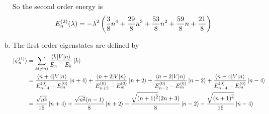 \documentclass[a4paper,german,12pt,smallheadings]{scrartcl}
\begin{document}
\begin{enumerate}[a)]
    So the second order energy is
    \begin{equation*}
      E_n^{(2)}(\lambda)  = -\lambda^2 \del{\frac{3}{8}n^4 + \frac{29}{8}n^3 + \frac{53}{8}n^2 + \frac{59}{8} n + \frac{21}{8}}
    \end{equation*}

  \item
    The first order eigenstates are defined by
    \begin{align*}
      \ket{\psi_n^{(1)}} &= \sum_{k (\neq n)} \frac{\braket{k|V|n}}{E_n - E_k} \ket{k} \\
      &=
      \frac{\braket{n+4|V|n}}{E^{(0)}_{n+4} - E^{(0)}_{m}} \ket{n+4} +
      \frac{\braket{n+2|V|n}}{E^{(0)}_{n+2} - E^{(0)}_{m}} \ket{n+2} +
      \frac{\braket{n-2|V|n}}{E^{(0)}_{n-2} - E^{(0)}_{m}} \ket{n-2} +
      \frac{\braket{n-4|V|n}}{E^{(0)}_{n-4} - E^{(0)}_{m}} \ket{n-4} \\
      &= 
      \frac{\sqrt{n^{\underline 4}}}{16} \ket{n+4}
      +\frac{\sqrt{n^{\underline 2}}(n-1)}{8} \ket{n+2}
      -\frac{\sqrt{(n+1)^{\overline 2}}(2n+3)}{8} \ket{n-2}
      -\frac{\sqrt{(n+1)^{\overline 4}}}{16} \ket{n-4} \\\
    \end{align*}

\end{enumerate}
\end{document}
